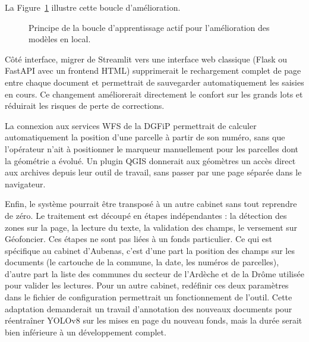 La Figure~\ref{fig:apprentissage_actif} illustre cette boucle d'amélioration.

\begin{figure}[H]
  \centering
  \caption{Principe de la boucle d'apprentissage actif pour l'amélioration des modèles en local.}
  \label{fig:apprentissage_actif}
\end{figure}

Côté interface, migrer de Streamlit vers une interface web classique (Flask ou FastAPI avec un frontend HTML) supprimerait le rechargement complet de page entre chaque document et permettrait de sauvegarder automatiquement les saisies en cours. Ce changement améliorerait directement le confort sur les grands lots et réduirait les risques de perte de corrections.

La connexion aux services WFS de la DGFiP permettrait de calculer automatiquement la position d'une parcelle à partir de son numéro, sans que l'opérateur n'ait à positionner le marqueur manuellement pour les parcelles dont la géométrie a évolué. Un plugin QGIS donnerait aux géomètres un accès direct aux archives depuis leur outil de travail, sans passer par une page séparée dans le navigateur.

Enfin, le système pourrait être transposé à un autre cabinet sans tout reprendre de zéro. Le traitement est découpé en étapes indépendantes : la détection des zones sur la page, la lecture du texte, la validation des champs, le versement sur Géofoncier. Ces étapes ne sont pas liées à un fonds particulier. Ce qui est spécifique au cabinet d'Aubenas, c'est d'une part la position des champs sur les documents (le cartouche de la commune, la date, les numéros de parcelles), d'autre part la liste des communes du secteur de l'Ardèche et de la Drôme utilisée pour valider les lectures. Pour un autre cabinet, redéfinir ces deux paramètres dans le fichier de configuration permettrait un fonctionnement de l'outil. Cette adaptation demanderait un travail d'annotation des nouveaux documents pour réentraîner YOLOv8 sur les mises en page du nouveau fonds, mais la durée serait bien inférieure à un développement complet.
